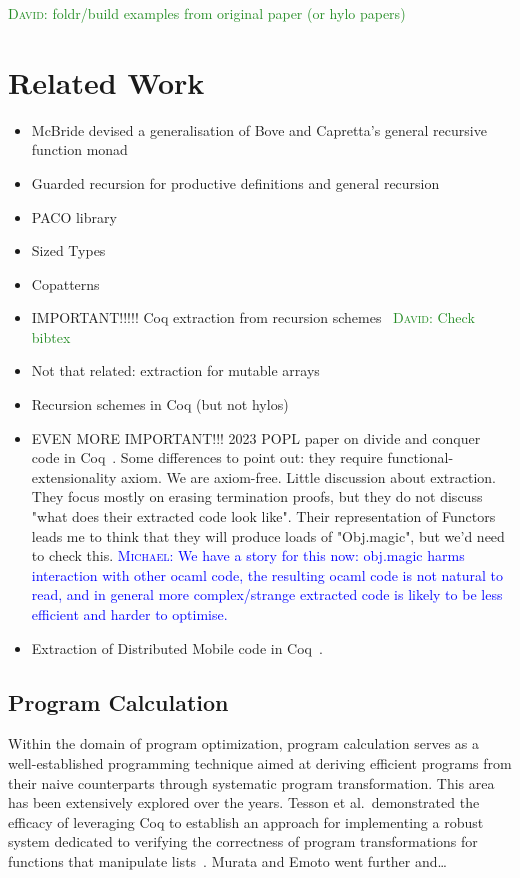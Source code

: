 \documentclass[anonymous, a4paper, UKenglish, cleveref, autoref, thm-restate]{lipics-v2021}
\newcommand{\dcas}[1]{\textcolor{ForestGreen}{\textsc{David}: #1}}
\newcommand{\mvol}[1]{\textcolor{blue}{\textsc{Michael}: #1}}
\begin{document}
\dcas{foldr/build examples from original paper (or hylo papers)}

\section{Related Work}

\begin{itemize}
  \item McBride devised a generalisation of Bove and Capretta's general
recursive function monad~\cite{McBride15, BoveC01}
  \item Guarded recursion for productive definitions and general recursion
~\cite{AtkeyM13, PaviottiMB15}
  \item PACO library~\cite{HurNDV13}
  \item Sized Types \cite{HughesPS96, abs-1202-3496}
  \item Copatterns \cite{AbelPTS13, AbelP16}
  \item IMPORTANT!!!!! Coq extraction from recursion
    schemes~\cite{larchey2022braga} \dcas{Check bibtex}
  \item Not that related: extraction for mutable arrays~\cite{SAKAGUCHI2020102372}
  \item Recursion schemes in Coq (but not hylos)~\cite{MurataE19}
  \item EVEN MORE IMPORTANT!!! 2023 POPL paper on divide and conquer code in
    Coq~\cite{AbreuDHJMS23}.  Some differences to point out: they require
    functional-extensionality axiom. We are axiom-free. Little discussion about
    extraction. They focus mostly on erasing termination proofs, but they do
    not discuss "what does their extracted code look like". Their
    representation of Functors leads me to think that they will produce loads
        of "Obj.magic", but we'd need to check this. \mvol{We have a story for this now: obj.magic harms interaction with other ocaml code, the resulting ocaml code is not natural to read, and in general more complex/strange extracted code is likely to be less efficient and harder to optimise.}
        \item Extraction of Distributed Mobile code in Coq~\cite{MiculanP12}.
\end{itemize}

\subsection{Program Calculation}

Within the domain of program optimization, program calculation serves as a
well-established programming technique aimed at deriving efficient programs from
their naive counterparts through systematic program transformation. This area
has been extensively explored over the years. Tesson et al.\ demonstrated the
efficacy of leveraging Coq to establish an approach for implementing a robust
system dedicated to verifying the correctness of program transformations for
functions that manipulate lists~\cite{10.1007/978-3-642-17796-5_10}. Murata and
Emoto went further and\ldots~\cite{MurataE19}
\end{document}
